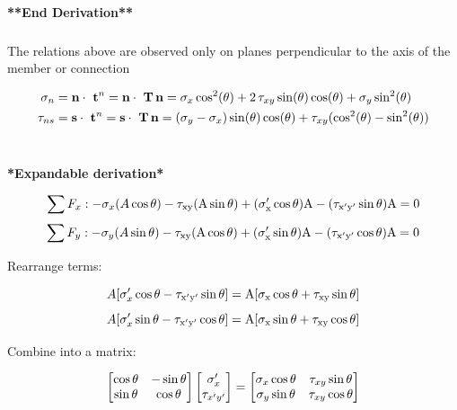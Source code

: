 \noindent \textbf{**End Derivation**}

\subsubsection{}

\noindent The relations above are observed only on planes perpendicular to the axis of the member or connection

\begin{align}
\sigma_n &= {\bf n}\cdot\ {\bf t}^{n}={\bf n}\cdot\ {\bf T}\,{\bf n} = \sigma_{x} \cos ^2(\theta) + 2 \,\tau_{xy} \sin(\theta) \cos(\theta)+\sigma_{y} \sin ^2(\theta) \\
\tau_{ns} &= {\bf s}\cdot\ {\bf t}^{n}={\bf s}\cdot\ {\bf T}\,{\bf n} = (\sigma_y - \sigma_{x}) \sin(\theta) \cos(\theta) + \tau_{xy} ( \cos^2(\theta) - \sin^2(\theta) )
\end{align}\


\noindent \textbf{*Expandable derivation*}

\[\sum F_x: -\sigma_x (A\rm\cos\theta) - \tau_{xy}(A\rm\sin\theta) + (\sigma_{x}'\rm\cos\theta)A - (\tau_{x'y'}\rm\sin\theta)A=0\]
\[\sum F_y: -\sigma_y (A\rm\sin\theta) - \tau_{xy}(A\rm\cos\theta) + (\sigma_{x}'\rm\sin\theta)A - (\tau_{x'y'}\rm\cos\theta)A=0\]

\noindent Rearrange terms:

\[A[\sigma_{x}'\rm\cos\theta - \tau_{x'y'}\rm\sin\theta] = A[\sigma_{x}\rm\cos\theta + \tau_{xy}\rm\sin\theta]\]
\[A[\sigma_{x}'\rm\sin\theta - \tau_{x'y'}\rm\cos\theta] = A[\sigma_{x}\rm\sin\theta + \tau_{xy}\rm\cos\theta]\]

\noindent Combine into a matrix:

\[\begin{bmatrix}
\rm\cos\theta & -\rm\sin\theta \\
\rm\sin\theta & \rm\cos\theta
\end{bmatrix}
\begin{bmatrix}
\sigma_{x}' \\
\tau_{x'y'}
\end{bmatrix} =
\begin{bmatrix}
\sigma_{x}\rm\cos\theta & \tau_{xy}\rm\sin\theta \\
\sigma_{y}\rm\sin\theta & \tau_{xy}\rm\cos\theta
\end{bmatrix}
\]
        
